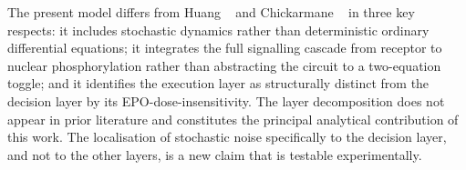 The present model differs from Huang \etal~\cite{huang2007} and Chickarmane
\etal~\cite{chickarmane2009} in three key respects: it includes stochastic
dynamics rather than deterministic ordinary differential equations; it integrates
the full signalling cascade from receptor to nuclear phosphorylation rather than
abstracting the circuit to a two-equation toggle; and it identifies the execution
layer as structurally distinct from the decision layer by its EPO-dose-insensitivity.
The layer decomposition does not appear in prior literature and constitutes the
principal analytical contribution of this work. The localisation of stochastic
noise specifically to the decision layer, and not to the other layers, is a new
claim that is testable experimentally.
